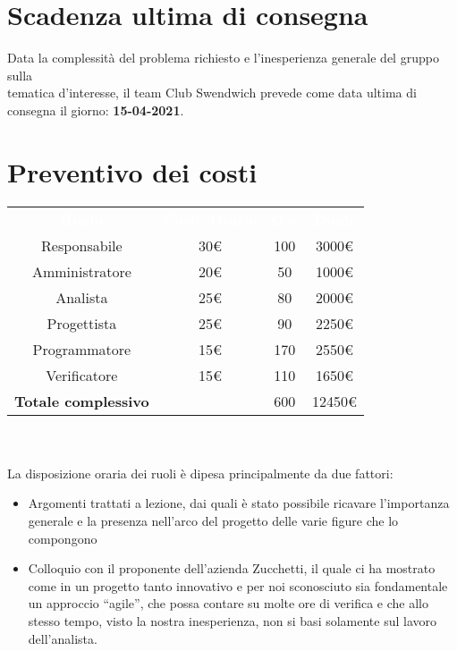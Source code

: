 \section{Scadenza ultima di consegna}
Data la complessità del problema richiesto e l'inesperienza generale del gruppo sulla \\
tematica d'interesse, il team Club Swendwich prevede come data ultima di consegna 
il giorno: \textbf{15-04-2021}.

\section{Preventivo dei costi}
{\renewcommand{\arraystretch}{1.5}
\begin{tabular}{cccc}
	\rowcolor[RGB]{33, 73, 50}
	\textcolor{white}{\textbf{Ruolo}} & \textcolor{white}{\textbf{Costo Orario}} 
    & \textcolor{white}{\textbf{Ore}} & \textcolor{white}{\textbf{Totale}}\\
	\rowcolor[RGB]{216, 235, 171}
	Responsabile & 30€ & 100 & 3000€     			\\
	\rowcolor[RGB]{233, 245, 206}
	Amministratore & 20€ & 50 & 1000€    			\\
    \rowcolor[RGB]{216, 235, 171}
	Analista & 25€ & 80 & 2000€          			\\
	\rowcolor[RGB]{233, 245, 206}
	Progettista & 25€ & 90 & 2250€       			\\
    \rowcolor[RGB]{216, 235, 171}
	Programmatore & 15€ & 170 & 2550€     			\\
	\rowcolor[RGB]{233, 245, 206}
	Verificatore & 15€ & 110 & 1650€      			\\
	\rowcolor[RGB]{216, 235, 171}
	\textbf{Totale complessivo} & & 600 & 12450€    \\
\end{tabular}	
}
\\\\
La disposizione oraria dei ruoli è dipesa principalmente da due fattori:
\begin{itemize}
	\item Argomenti trattati a lezione, dai quali è stato possibile ricavare l'importanza generale e la presenza nell'arco del progetto delle varie figure che lo compongono
	\item Colloquio con il proponente dell'azienda Zucchetti, il quale ci ha mostrato come in un progetto tanto innovativo e per noi sconosciuto sia fondamentale un approccio ``agile'', che possa contare su molte ore di verifica e che allo stesso tempo, visto la nostra inesperienza, non si basi solamente sul lavoro dell'analista.
\end{itemize}

